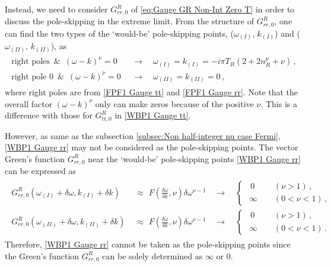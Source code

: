 \documentclass[11pt,a4paper]{article}
\begin{document}
Instead, we need to consider $G^R_{rr,0}$ of \eqref{eq:Gauge GR Non-Int Zero T} in order to discuss the pole-skipping in the extreme limit. 
From the structure of $G^R_{rr,0}$, one can find the two types of the `would-be' pole-skipping points, ($\omega_{(I)},\, k_{(I)}$) and ($\omega_{(II)},\, k_{(II)}$), as
\begin{align}\label{WBP1 Gauge rr}
\begin{split}
\text{right poles} \,\,\,\&\,\,\, (\omega-k)^{\nu} = 0 \quad&\rightarrow\quad \omega_{(I)} = k_{(I)} = - i \pi T_R (2 + 2 n^{p}_{R} + \nu)\,,\\
%
\text{right pole 0} \,\,\,\&\,\,\, (\omega-k)^{\nu} = 0 \quad&\rightarrow\quad \omega_{(II)} = k_{(II)} = 0\,,
\end{split} 
\end{align}
where right poles are from \eqref{FPF1 Gauge tt} and \eqref{FPF1 Gauge rr}. Note that the overall factor $(\omega-k)^{\nu}$ only can make zeros because of the positive $\nu$. This is a difference with those for $G^R_{tt,0}$ in \eqref{WBP1 Gauge tt}.

However, as same as the subsection \ref{subsec:Non half-integer nu case Fermi}, \eqref{WBP1 Gauge rr} may not be considered as the pole-skipping points. The vector Green's function $G^R_{rr,0}$ near the `would-be' pole-skipping points \eqref{WBP1 Gauge rr} can be expressed as
\begin{align}\label{CHECKINGPSW Gauge rr}
\begin{split}
G^R_{rr,0}(\omega_{(I)} + \delta \omega, k_{(I)} + \delta k)  &\,\,\approx\,\, F\left(\frac{\delta \omega}{\delta k}, \nu\right) \delta \omega^{\nu-1} \quad\rightarrow\quad
\begin{cases}
       \,\,\, 0 \qquad\,\, \left(\nu>1\right) \,,\\
       \,\, \infty \qquad \left(0<\nu<1\right) \,,
\end{cases}
%
\\
G^R_{rr,0}(\omega_{(II)} + \delta \omega, k_{(II)} + \delta k)  &\,\,\approx\,\, F\left(\frac{\delta \omega}{\delta k}, \nu\right) \delta \omega^{\nu-1} \quad\rightarrow\quad
\begin{cases}
       \,\,\, 0 \qquad\,\, \left(\nu>1\right) \,,\\
       \,\, \infty \qquad \left(0<\nu<1\right) \,.
\end{cases}
\end{split} 
\end{align}
Therefore, \eqref{WBP1 Gauge rr} cannot be taken as the pole-skipping points since the Green's function $G^R_{rr,0}$ can be solely determined as $\infty$ or $0$.
\end{document}
